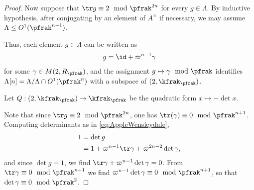 \begin{proof}
    Now suppose that $\tr g \equiv 2 \mod \pfrak^{2n}$ for every $g\in \Lambda$. By inductive hypothesis, after conjugating by an element of $A^\times$ if necessary, we may assume $\Lambda \leq O^1(\pfrak^{n-1})$.

    Thus, each element $g\in \Lambda$ can be written as
    \begin{align}\label{eq:AppleWensleydale}
        g = \id +\varpi^{n-1} \gamma
    \end{align}
    for some $\gamma \in M(2, R_\pfrak)$, and the assignment $g \mapsto \gamma \mod \pfrak$ identifies $\Lambda[n] = \Lambda /\Lambda \cap O^1(\pfrak^n)$ with a subspace of  $\sl(2,\kfrak_\pfrak)$.

    \begin{claim}\label{claim:BreadfruitDessertnyjBelyj}
        Let $Q:\sl(2,\kfrak_\pfrak) \to \kfrak_\pfrak$ be the quadratic form $x \mapsto -\det x$.
    \end{claim}

    Note that since $\tr g \equiv 2 \mod \pfrak^{2n}$, one has $\tr(\gamma) \equiv 0 \mod \pfrak^{n+1}$.
    Computing determinants as in \ref{eq:AppleWensleydale},
    \begin{align*}
        1 & = \det g                                                  \\
          & = 1 + \varpi^{n-1} \tr \gamma + \varpi^{2n-2}\det \gamma,
    \end{align*}
    and since $\det g =1$, we find $\tr \gamma +\varpi^{n-1}\det \gamma =0$. From $\tr \gamma  \equiv 0 \mod \pfrak^{n+1}$ we find $ \varpi^{n-1}\det \gamma \equiv 0 \mod \pfrak^{n+1}$, so that $\det \gamma \equiv 0 \mod \pfrak^2$.






\end{proof}
